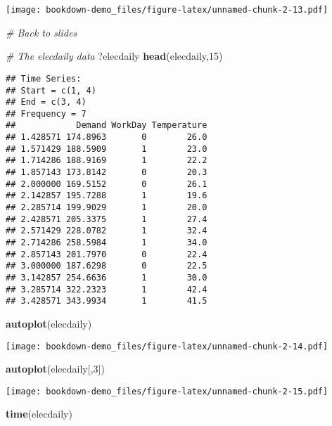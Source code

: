\documentclass[]{book}
\newenvironment{Shaded}{\begin{snugshade}}{\end{snugshade}}
\newcommand{\CommentTok}[1]{\textcolor[rgb]{0.56,0.35,0.01}{\textit{#1}}}
\newcommand{\DecValTok}[1]{\textcolor[rgb]{0.00,0.00,0.81}{#1}}
\newcommand{\KeywordTok}[1]{\textcolor[rgb]{0.13,0.29,0.53}{\textbf{#1}}}
\newcommand{\NormalTok}[1]{#1}
\begin{document}
\texttt{[image: bookdown-demo\_files/figure-latex/unnamed-chunk-2-13.pdf]}

\begin{Shaded}
\begin{Highlighting}[]
\CommentTok{# Back to slides}

  \CommentTok{# The elecdaily data}
\NormalTok{  ?elecdaily}
  \KeywordTok{head}\NormalTok{(elecdaily,}\DecValTok{15}\NormalTok{)}
\end{Highlighting}
\end{Shaded}

\begin{verbatim}
## Time Series:
## Start = c(1, 4) 
## End = c(3, 4) 
## Frequency = 7 
##            Demand WorkDay Temperature
## 1.428571 174.8963       0        26.0
## 1.571429 188.5909       1        23.0
## 1.714286 188.9169       1        22.2
## 1.857143 173.8142       0        20.3
## 2.000000 169.5152       0        26.1
## 2.142857 195.7288       1        19.6
## 2.285714 199.9029       1        20.0
## 2.428571 205.3375       1        27.4
## 2.571429 228.0782       1        32.4
## 2.714286 258.5984       1        34.0
## 2.857143 201.7970       0        22.4
## 3.000000 187.6298       0        22.5
## 3.142857 254.6636       1        30.0
## 3.285714 322.2323       1        42.4
## 3.428571 343.9934       1        41.5
\end{verbatim}

\begin{Shaded}
\begin{Highlighting}[]
  \KeywordTok{autoplot}\NormalTok{(elecdaily)}
\end{Highlighting}
\end{Shaded}

\texttt{[image: bookdown-demo\_files/figure-latex/unnamed-chunk-2-14.pdf]}

\begin{Shaded}
\begin{Highlighting}[]
  \KeywordTok{autoplot}\NormalTok{(elecdaily[,}\DecValTok{3}\NormalTok{])}
\end{Highlighting}
\end{Shaded}

\texttt{[image: bookdown-demo\_files/figure-latex/unnamed-chunk-2-15.pdf]}

\begin{Shaded}
\begin{Highlighting}[]
  \KeywordTok{time}\NormalTok{(elecdaily)}
\end{Highlighting}
\end{Shaded}
\end{document}
